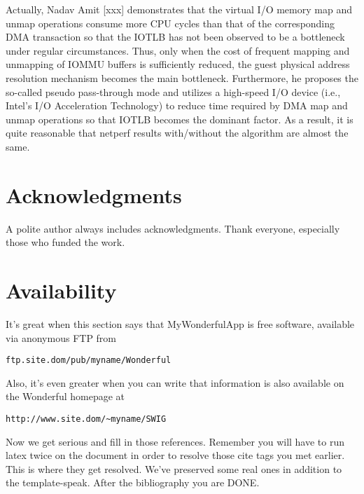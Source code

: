 \documentclass[letterpaper,twocolumn,10pt]{article}
\begin{document}
Actually, Nadav Amit [xxx] demonstrates that the virtual I/O memory map and unmap operations consume more CPU cycles than  that of the corresponding DMA transaction so that the IOTLB has not been observed to be a bottleneck under regular circumstances. Thus, only when the cost of frequent mapping and unmapping of IOMMU buffers is sufficiently reduced, the guest physical address resolution mechanism becomes the main bottleneck. Furthermore, he proposes the so-called pseudo pass-through mode and utilizes a high-speed I/O device (i.e., Intel’s I/O Acceleration Technology) to reduce time required by DMA map and unmap operations so that IOTLB becomes the dominant factor. As a result, it is quite reasonable that netperf results with/without the algorithm are almost the same.



\section{Acknowledgments}

A polite author always includes acknowledgments.  Thank everyone,
especially those who funded the work.

\section{Availability}

It's great when this section says that MyWonderfulApp is free software,
available via anonymous FTP from

\begin{center}
{\tt ftp.site.dom/pub/myname/Wonderful}\\
\end{center}

Also, it's even greater when you can write that information is also
available on the Wonderful homepage at

\begin{center}
{\tt http://www.site.dom/\~{}myname/SWIG}
\end{center}

Now we get serious and fill in those references.  Remember you will
have to run latex twice on the document in order to resolve those
cite tags you met earlier.  This is where they get resolved.
We've preserved some real ones in addition to the template-speak.
After the bibliography you are DONE.

{\footnotesize 
}


\theendnotes
\end{document}
